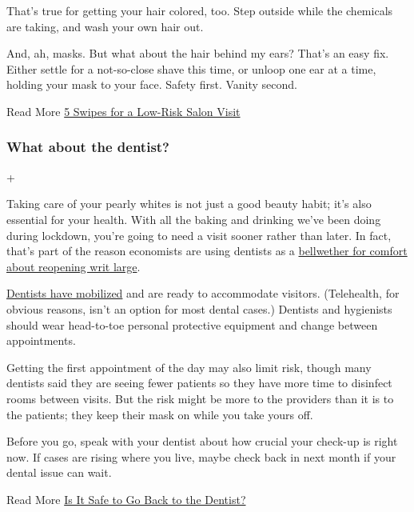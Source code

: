 That's true for getting your hair colored, too. Step outside while the
chemicals are taking, and wash your own hair out.

And, ah, masks. But what about the hair behind my ears? That's an easy
fix. Either settle for a not-so-close shave this time, or unloop one ear
at a time, holding your mask to your face. Safety first. Vanity second.

 Read More
\href{https://www.nytimes3xbfgragh.onion/interactive/2020/06/17/burst/5-swipes-for-a-low-risk-salon-visit.html}{5
Swipes for a Low-Risk Salon Visit}

\hypertarget{what-about-the-dentist}{%
\subsubsection{What about the dentist?}\label{what-about-the-dentist}}

+

Taking care of your pearly whites is not just a good beauty habit; it's
also essential for your health. With all the baking and drinking we've
been doing during lockdown, you're going to need a visit sooner rather
than later. In fact, that's part of the reason economists are using
dentists as a
\href{https://www.nytimes3xbfgragh.onion/2020/06/10/upshot/dentists-coronavirus-economic-indicator.html}{bellwether
for comfort about reopening writ large}.

\href{https://www.nytimes3xbfgragh.onion/2020/06/08/well/live/dental-care-dentistry-teeth-coronavirus.html}{Dentists
have mobilized} and are ready to accommodate visitors. (Telehealth, for
obvious reasons, isn't an option for most dental cases.) Dentists and
hygienists should wear head-to-toe personal protective equipment and
change between appointments.

Getting the first appointment of the day may also limit risk, though
many dentists said they are seeing fewer patients so they have more time
to disinfect rooms between visits. But the risk might be more to the
providers than it is to the patients; they keep their mask on while you
take yours off.

Before you go, speak with your dentist about how crucial your check-up
is right now. If cases are rising where you live, maybe check back in
next month if your dental issue can wait.

 Read More
\href{https://www.nytimes3xbfgragh.onion/2020/06/25/health/dentist-coronavirus-safe.html}{Is
It Safe to Go Back to the Dentist?}

